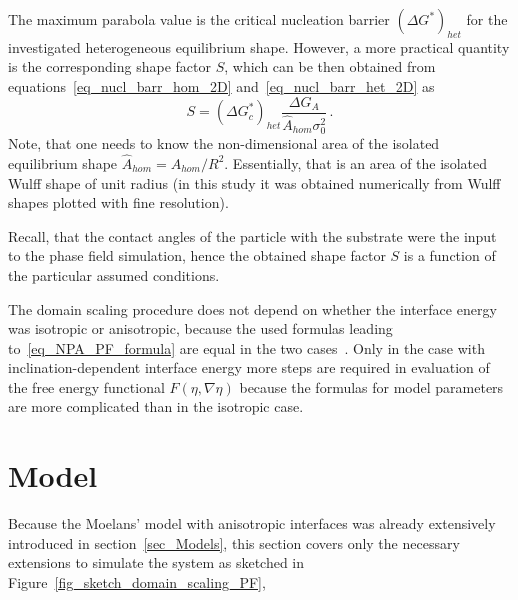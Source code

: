 The maximum parabola value is the critical nucleation barrier $(\Delta G^*)_{het}$ for the investigated heterogeneous equilibrium shape. However, a more practical quantity is the corresponding shape factor $S$, which can be then obtained from equations~\eqref{eq_nucl_barr_hom_2D} and~\eqref{eq_nucl_barr_het_2D} as
\begin{equation} \label{eq_NPA_PF_formula}
	S = (\Delta G_c^*)_{het}\frac{\Delta G_A}{\hat{A}_{hom}\sigma_0^2} \,.
\end{equation}
Note, that one needs to know the non-dimensional area of the isolated equilibrium shape $\hat{A}_{hom}=A_{hom}/R^2$. Essentially, that is an area of the isolated Wulff shape of unit radius (in this study it was obtained numerically from Wulff shapes plotted with fine resolution).

Recall, that the contact angles of the particle with the substrate were the input to the phase field simulation, hence the obtained shape factor $S$ is a function of the particular assumed conditions. 

The domain scaling procedure does not depend on whether the interface energy was isotropic or anisotropic, because the used formulas leading to~\eqref{eq_NPA_PF_formula} are equal in the two cases~\cite{Mariaux2011}. Only in the case with inclination-dependent interface energy more steps are required in evaluation of the free energy functional $F(\eta,\nabla\eta)$ because the formulas for model parameters are more complicated than in the isotropic case.

\section{Model}
Because the Moelans' model with anisotropic interfaces was already extensively introduced in section~\ref{sec_Models}, this section covers only the necessary extensions to simulate the system as sketched in Figure~\ref{fig_sketch_domain_scaling_PF}, 


